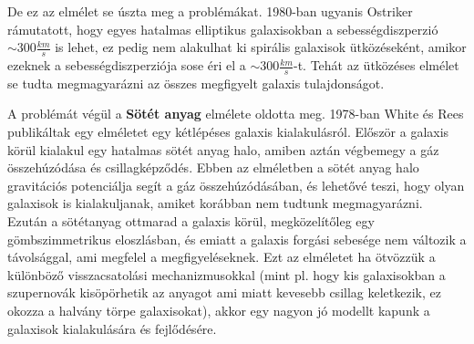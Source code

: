 \documentclass[../main.tex]{subfiles}
\begin{document}
De ez az elmélet se úszta meg a problémákat. 1980-ban ugyanis Ostriker rámutatott, hogy egyes hatalmas elliptikus galaxisokban a sebességdiszperzió $\sim 300 \frac{km}{s}$ is lehet, ez pedig nem alakulhat ki
spirális galaxisok ütközéseként, amikor ezeknek a sebességdiszperziója sose éri el a $\sim 300 \frac{km}{s}$-t. Tehát az ütközéses elmélet se tudta megmagyarázni az összes megfigyelt galaxis tulajdonságot.

A problémát végül a \textbf{Sötét anyag} elmélete oldotta meg. 1978-ban White és Rees publikáltak egy elméletet egy kétlépéses galaxis kialakulásról. Először a galaxis körül kialakul egy hatalmas sötét anyag halo,
amiben aztán végbemegy a gáz összehúzódása és csillagképződés. Ebben az elméletben a sötét anyag halo gravitációs potenciálja segít a gáz összehúzódásában, és lehetővé teszi, hogy olyan galaxisok is kialakuljanak,
amiket korábban nem tudtunk megmagyarázni. Ezután a sötétanyag ottmarad a galaxis körül, megközelítőleg egy gömbszimmetrikus eloszlásban, és emiatt a galaxis forgási sebesége nem változik a távolsággal,
ami megfelel a megfigyeléseknek. Ezt az elméletet ha ötvözzük a különböző visszacsatolási mechanizmusokkal (mint pl. hogy kis galaxisokban a szupernovák kisöpörhetik az anyagot ami miatt kevesebb csillag keletkezik,
ez okozza a halvány törpe galaxisokat), akkor egy nagyon jó modellt kapunk a galaxisok kialakulására és fejlődésére.
\end{document}
